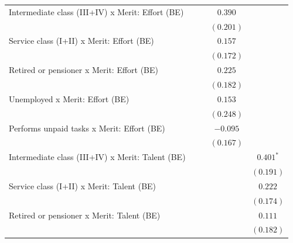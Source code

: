 \documentclass[
  12pt,
]{article}
\begin{document}
\begin{table}
{\begin{center}
{\begin{tabular}{l c c c c}
\quad Intermediate class (III+IV) x Merit: Effort (BE)          &               &               & $0.390$       &               \\
                                                                &               &               & $(0.201)$     &               \\
\quad Service class (I+II) x Merit: Effort (BE)                 &               &               & $0.157$       &               \\
                                                                &               &               & $(0.172)$     &               \\
\quad Retired or pensioner x Merit: Effort (BE)                 &               &               & $0.225$       &               \\
                                                                &               &               & $(0.182)$     &               \\
\quad Unemployed x Merit: Effort (BE)                           &               &               & $0.153$       &               \\
                                                                &               &               & $(0.248)$     &               \\
\quad Performs unpaid tasks x Merit: Effort (BE)                &               &               & $-0.095$      &               \\
                                                                &               &               & $(0.167)$     &               \\
\quad Intermediate class (III+IV) x Merit: Talent (BE)          &               &               &               & $0.401^{*}$   \\
                                                                &               &               &               & $(0.191)$     \\
\quad Service class (I+II) x Merit: Talent (BE)                 &               &               &               & $0.222$       \\
                                                                &               &               &               & $(0.174)$     \\
\quad Retired or pensioner x Merit: Talent (BE)                 &               &               &               & $0.111$       \\
                                                                &               &               &               & $(0.182)$     \\

\end{tabular}}
\end{center}}
\end{table}
\end{document}
